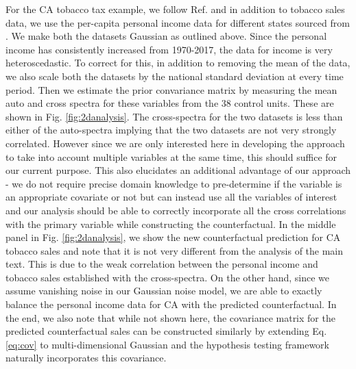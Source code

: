 \documentclass{article}
\begin{document}
For the CA tobacco tax example, we follow Ref. \cite{Abadie10} and in addition to tobacco sales data, we use the per-capita personal income data for different states sourced from \cite{sourceincome}. We make both the datasets Gaussian as outlined above. Since the personal income has consistently increased from 1970-2017, the data for income is very heteroscedastic. To correct for this, in addition to removing the mean of the data, we also scale both the datasets by the national standard deviation at every time period. Then we estimate the prior convariance matrix by measuring the mean auto and cross spectra for these variables from the 38 control units. These are shown in Fig. \ref{fig:2danalysis}. The cross-spectra for the two datasets is less than either of the auto-spectra implying that the two datasets are not very strongly correlated. However since we are only interested here in developing the approach to take into account multiple variables at the same time, this should suffice for our current purpose. This also elucidates an additional advantage of our approach - we do not require precise domain knowledge to pre-determine if the variable is an appropriate covariate or not but can instead use all the variables of interest and our analysis should be able to correctly incorporate all the cross correlations with the primary variable while constructing the counterfactual. In the middle panel in Fig. \ref{fig:2danalysis}, we show the new counterfactual prediction for CA tobacco sales and note that it is not very different from the analysis of the main text. This is due to the weak correlation between the personal income and tobacco sales established with the cross-spectra. On the other hand, since we assume vanishing noise in our Gaussian noise model, we are able to exactly balance the personal income data for CA with the predicted counterfactual. In the end, we also note that while not shown here, the covariance matrix for the predicted counterfactual sales can be constructed similarly by extending Eq. \ref{eq:cov} to multi-dimensional Gaussian and the hypothesis testing framework naturally incorporates this covariance.
\end{document}
